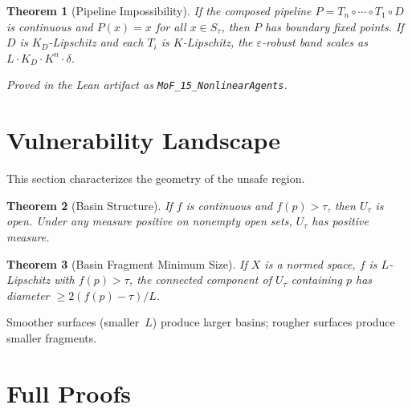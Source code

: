 \documentclass[11pt]{article}
\newtheorem{theorem}{Theorem}[section]
\begin{document}
\begin{theorem}[Pipeline Impossibility]
\label{thm:pipeline-impossible}
If the composed pipeline $P = T_n \circ \cdots \circ T_1 \circ D$ is
continuous and $P(x) = x$ for all $x \in S_\tau$, then $P$ has
boundary fixed points. If $D$ is $K_D$-Lipschitz and each $T_i$ is
$K$-Lipschitz, the $\varepsilon$-robust band scales as
$L \cdot K_D \cdot K^n \cdot \delta$.
\end{theorem}

\noindent\emph{Proved in the Lean artifact as
\textup{\texttt{MoF\_15\_NonlinearAgents}}.}

\begin{table}[h]
\centering
\small
\caption{Empirical pipeline Lipschitz degradation. The measured
composed constant $\hat K_{\text{composed}}$ is bounded above by
$\prod \hat K_i$, consistent with .}
\label{tab:pipeline}

\end{table}

\section{Vulnerability Landscape}
\label{app:landscape}

This section characterizes the geometry of the unsafe region.

\begin{theorem}[Basin Structure]
\label{thm:basin}
If $f$ is continuous and $f(p)>\tau$, then $U_\tau$ is open. Under
any measure positive on nonempty open sets, $U_\tau$ has positive
measure.
\end{theorem}

\begin{theorem}[Basin Fragment Minimum Size]
\label{thm:fragment}
If $X$ is a normed space, $f$ is $L$-Lipschitz with $f(p) > \tau$,
the connected component of $U_\tau$ containing $p$ has diameter
$\geq 2(f(p) - \tau)/L$.
\end{theorem}

Smoother surfaces (smaller~$L$) produce larger basins; rougher
surfaces produce smaller fragments.

\section{Full Proofs}
\label{app:proofs}
\end{document}

